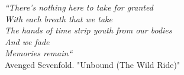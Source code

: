 \cleardoublepage
\thispagestyle{plain}

\vspace*{8cm}

\begin{flushright}
   \textsl{``There's nothing here to take for granted \\
           With each breath that we take \\
           The hands of time strip youth from our bodies \\
           And we fade \\
           Memories remain``} \\
\vspace*{1.5cm}
        Avenged Sevenfold. "Unbound (The Wild Ride)" \\
\end{flushright}
